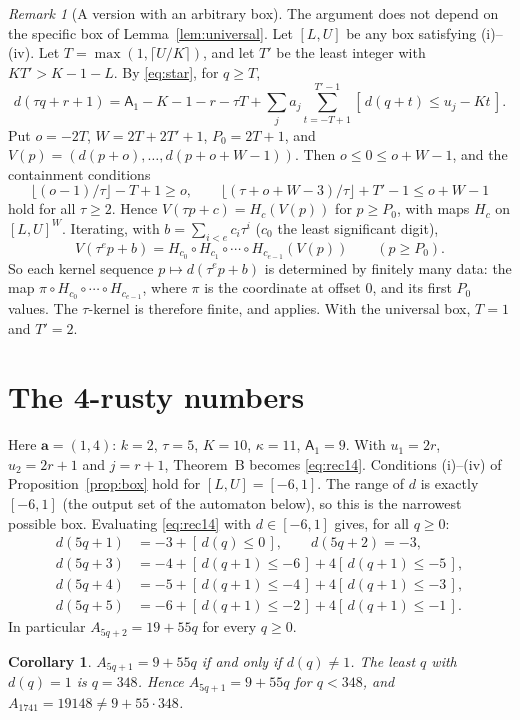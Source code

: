 \documentclass[11pt]{amsart}
\newtheorem{corollary}[theorem]{Corollary}
\theoremstyle{definition}
\theoremstyle{remark}
\newtheorem{remark}[theorem]{Remark}
\newcommand{\Iv}[1]{[\,#1\,]}
\begin{document}
\begin{remark}[A version with an arbitrary box]\label{rem:kernel}
The argument does not depend on the specific box of Lemma~\ref{lem:universal}. Let $[L,U]$ be any box satisfying (i)--(iv). Let $T=\max(1,\lceil U/K\rceil)$, and let $T'$ be the least integer with $KT'>K-1-L$. By \eqref{eq:star}, for $q\ge T$,
\[
d(\tau q+r+1)=\mathsf A_1-K-1-r-\tau T+\sum_ja_j\sum_{t=-T+1}^{T'-1}\Iv{d(q+t)\le u_j-Kt}.
\]
Put $o=-2T$, $W=2T+2T'+1$, $P_0=2T+1$, and $V(p)=(d(p+o),\dots,d(p+o+W-1))$. Then $o\le0\le o+W-1$, and the containment conditions
\[
\lfloor(o-1)/\tau\rfloor-T+1\ge o,\qquad \lfloor(\tau+o+W-3)/\tau\rfloor+T'-1\le o+W-1
\]
hold for all $\tau\ge2$. Hence $V(\tau p+c)=H_c(V(p))$ for $p\ge P_0$, with maps $H_c$ on $[L,U]^W$. Iterating, with $b=\sum_{i<e}c_i\tau^i$ ($c_0$ the least significant digit),
\[
V(\tau^ep+b)=H_{c_0}\circ H_{c_1}\circ\cdots\circ H_{c_{e-1}}(V(p))\qquad (p\ge P_0).
\]
So each kernel sequence $p\mapsto d(\tau^ep+b)$ is determined by finitely many data: the map $\pi\circ H_{c_0}\circ\cdots\circ H_{c_{e-1}}$, where $\pi$ is the coordinate at offset $0$, and its first $P_0$ values. The $\tau$-kernel is therefore finite, and \cite[Thm.~6.6.2]{AS} applies. With the universal box, $T=1$ and $T'=2$.
\end{remark}

\section{The 4-rusty numbers}\label{sec:rusty}
Here $\mathbf a=(1,4)$: $k=2$, $\tau=5$, $K=10$, $\kappa=11$, $\mathsf A_1=9$. With $u_1=2r$, $u_2=2r+1$ and $j=r+1$, Theorem~B becomes \eqref{eq:rec14}. Conditions (i)--(iv) of Proposition~\ref{prop:box} hold for $[L,U]=[-6,1]$. The range of $d$ is exactly $[-6,1]$ (the output set of the automaton below), so this is the narrowest possible box. Evaluating \eqref{eq:rec14} with $d\in[-6,1]$ gives, for all $q\ge0$:
\begin{align*}
d(5q+1)&=-3+\Iv{d(q)\le0},\qquad d(5q+2)=-3,\\
d(5q+3)&=-4+\Iv{d(q+1)\le-6}+4\Iv{d(q+1)\le-5},\\
d(5q+4)&=-5+\Iv{d(q+1)\le-4}+4\Iv{d(q+1)\le-3},\\
d(5q+5)&=-6+\Iv{d(q+1)\le-2}+4\Iv{d(q+1)\le-1}.
\end{align*}
In particular $A_{5q+2}=19+55q$ for every $q\ge0$.

\begin{corollary}\label{cor:1741}
$A_{5q+1}=9+55q$ if and only if $d(q)\ne1$. The least $q$ with $d(q)=1$ is $q=348$. Hence $A_{5q+1}=9+55q$ for $q<348$, and $A_{1741}=19148\ne 9+55\cdot348$.
\end{corollary}
\end{document}
